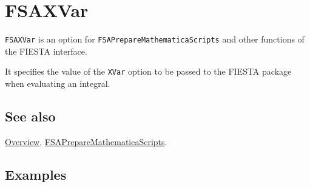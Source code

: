 \documentclass[../FeynHelpersManual.tex]{subfiles}
\begin{document}
\hypertarget{fsaxvar}{
\section{FSAXVar}\label{fsaxvar}}

\texttt{FSAXVar} is an option for \texttt{FSAPrepareMathematicaScripts}
and other functions of the FIESTA interface.

It specifies the value of the \texttt{XVar} option to be passed to the
FIESTA package when evaluating an integral.

\subsection{See also}

\hyperlink{toc}{Overview},
\hyperlink{fsapreparemathematicascripts}{FSAPrepareMathematicaScripts}.

\subsection{Examples}
\end{document}
